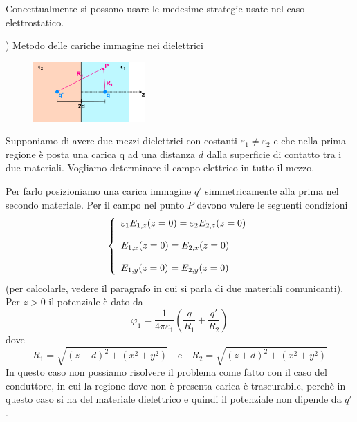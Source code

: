 Concettualmente si possono usare le medesime strategie usate nel caso elettrostatico.
\newline

) Metodo delle cariche immagine nei dielettrici

\begin{figure} %
    \centering
    \includegraphics[width=0.38\textwidth]{images/polimage} %
\end{figure}

Supponiamo di avere due mezzi dielettrici con costanti $\varepsilon_{1} \neq \varepsilon_{2}$ e che nella prima regione \`e posta una carica q ad una distanza $d$ dalla superficie di contatto tra i due materiali. Vogliamo determinare il campo elettrico in tutto il mezzo. 

Per farlo posizioniamo una carica immagine $q'$ simmetricamente alla prima nel secondo materiale. Per il campo nel punto $P$ devono valere le seguenti condizioni
\begin{equation*}
	\left \{ \begin{array}{l}
		\varepsilon_{1} E_{1,z}(z=0) = \varepsilon_{2}E_{2,z}(z=0) \\ \rule{0pt}{20pt}
		E_{1,x}(z=0) = E_{2,x}(z=0) \\ \rule{0pt}{20pt}
		E_{1,y}(z=0) = E_{2,y}(z=0)
	\end{array}\right.
\end{equation*}
(per calcolarle, vedere il paragrafo in cui si parla di due materiali comunicanti). Per $z>0$ il potenziale \`e dato da
\begin{equation*}
	\varphi_{1} = \frac{1}{4 \pi \varepsilon_1}\left(\frac{q}{R_1} + \frac{q'}{R_2}\right)
\end{equation*} 
dove 
\begin{equation*}
	R_{1} = \sqrt{(z-d)^2 + (x^2 + y^2)} \quad \text {e} \quad R_2 = \sqrt{(z+d)^2 + (x^2+y^2)}
\end{equation*}
In questo caso non possiamo risolvere il problema come fatto con il caso del conduttore, in cui la regione dove non \`e presenta carica \`e trascurabile, perch\`e in questo caso si ha del materiale dielettrico e quindi il potenziale non dipende da $q'$.

